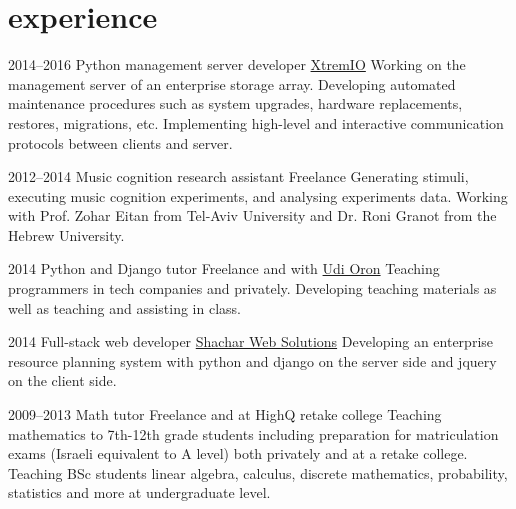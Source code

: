 \documentclass[]{friggeri-cv}
\begin{document}
\pagebreak


\section{experience}

\begin{entrylist}

    \entry
    {2014--2016}
    {Python management server developer}
    {\href{http://xtremio.com/}{XtremIO}}
    {
      Working on the management server of an enterprise storage array.
      Developing automated maintenance procedures such as system upgrades, hardware replacements, restores, migrations, etc.
      Implementing high-level and interactive communication protocols between clients and server.
    }

\end{entrylist}
\begin{entrylist}

    \entry
    {2012--2014}
    {Music cognition research assistant}
    {Freelance}
    {
      Generating stimuli, executing music cognition experiments, and analysing experiments data.
      Working with Prof. Zohar Eitan from Tel-Aviv University and Dr. Roni Granot from the Hebrew University.
    }

\end{entrylist}
\begin{entrylist}

    \entry
    {2014}
    {Python and Django tutor}
    {Freelance and with \href{http://www.10x.org.il/}{Udi Oron}}
    {
      Teaching programmers in tech companies and privately.
      Developing teaching materials as well as teaching and assisting in class.
    }

\end{entrylist}
\begin{entrylist}

    \entry
    {2014}
    {Full-stack web developer}
    {\href{http://www.shachar-web.co.il/eng/}{Shachar Web Solutions}}
    {
      Developing an enterprise resource planning system with python and django on the server side and jquery on the client side.
    }

\end{entrylist}
\begin{entrylist}

    \entry
    {2009--2013}
    {Math tutor}
    {Freelance and at HighQ retake college}
    {
      Teaching mathematics to 7th-12th grade students including preparation for matriculation exams (Israeli equivalent to A level) both privately and at a retake college.
      Teaching BSc students linear algebra, calculus, discrete mathematics, probability, statistics and more at undergraduate level.
    }

\end{entrylist}
\end{document}
